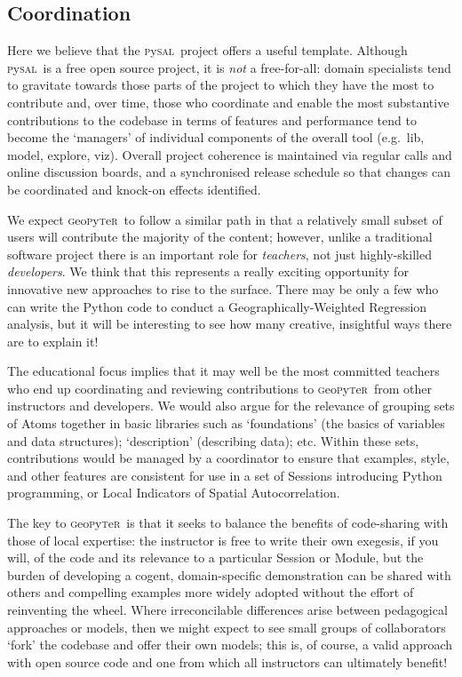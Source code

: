 \documentclass[letter, 11pt,titlepage]{article}
\newcommand{\gp}{\textsc{g}eo\textsc{p}y\textsc{t}e\textsc{r}~\/}
\newcommand{\eg}{e.g.~\/}
\newcommand{\pysal}{\textsc{p}y\textsc{sal}~\/}
\begin{document}
\subsection{Coordination}

Here we believe that the \pysal project offers a useful template. Although \pysal is a free open source project, it is \emph{not} a free-for-all: domain specialists tend to gravitate towards those parts of the project to which they have the most to contribute and, over time, those who coordinate and enable the most substantive contributions to the codebase in terms of features and performance tend to become the `managers' of individual components of the overall tool (\eg lib, model, explore, viz). Overall project coherence is maintained via regular calls and online discussion boards, and a synchronised release schedule so that changes can be coordinated and knock-on effects identified.

We expect \gp to follow a similar path in that a relatively small subset of users will contribute the majority of the content; however, unlike a traditional software project there is an important role for \emph{teachers}, not just highly-skilled \emph{developers}. We think that this represents a really exciting opportunity for innovative new approaches to rise to the surface. There may be only a few who can write the Python code to conduct a Geographically-Weighted Regression analysis, but it will be interesting to see how many creative, insightful ways there are to explain it! 

The educational focus implies that it may well be the most committed teachers who end up coordinating and reviewing contributions to \gp from other instructors and developers. We would also argue for the relevance of grouping sets of Atoms together in basic libraries such as `foundations' (the basics of variables and data structures); `description' (describing data); etc. Within these sets, contributions would be managed by a coordinator to ensure that examples, style, and other features are consistent for use in a set of Sessions introducing Python programming, or Local Indicators of Spatial Autocorrelation.

The key to \gp is that it seeks to balance the benefits of code-sharing with those of local expertise: the instructor is free to write their own exegesis, if you will, of the code and its relevance to a particular Session or Module, but the burden of developing a cogent, domain-specific demonstration can be shared with others and compelling examples more widely adopted without the effort of reinventing the wheel. Where irreconcilable differences arise between pedagogical approaches or models, then we might expect to see small groups of collaborators `fork' the codebase and offer their own models; this is, of course, a valid approach with open source code and one from which all instructors can ultimately benefit!
\end{document}
